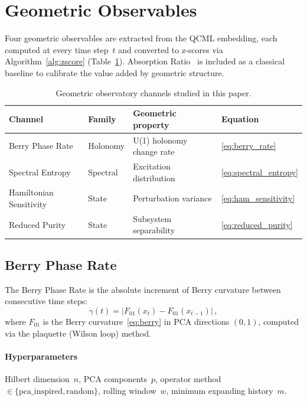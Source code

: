 \documentclass[3p]{elsarticle}
\begin{document}
\section{Geometric Observables}\label{sec:observables}

Four geometric observables are extracted from the QCML
embedding, each computed at every time step~$t$ and converted to
z-scores via Algorithm~\ref{alg:zscore}
(Table~\ref{tab:observatory_channels}).  Absorption
Ratio~\cite{kritzman2011} is included as a classical baseline
to calibrate the value added by geometric structure.

\begin{table}[htb]
\centering
\caption{Geometric observatory channels studied in this paper.}
\label{tab:observatory_channels}
\small
\begin{tabular}{llll}
\toprule
Channel & Family & Geometric property & Equation \\
\midrule
Berry Phase Rate & Holonomy & U(1) holonomy change rate & \eqref{eq:berry_rate} \\
Spectral Entropy & Spectral & Excitation distribution & \eqref{eq:spectral_entropy} \\
Hamiltonian Sensitivity & State & Perturbation variance & \eqref{eq:ham_sensitivity} \\
Reduced Purity & State & Subsystem separability & \eqref{eq:reduced_purity} \\
\bottomrule
\end{tabular}
\end{table}

\subsection{Berry Phase Rate}\label{subsec:berry}

The Berry Phase Rate is the absolute increment of Berry curvature
between consecutive time steps:
\begin{equation}\label{eq:berry_rate}
  \dot{\gamma}(t) = |F_{01}(x_t) - F_{01}(x_{t-1})|\,,
\end{equation}
where $F_{01}$ is the Berry curvature~\eqref{eq:berry} in PCA
directions $(0,1)$, computed via the plaquette (Wilson loop) method.

\paragraph{Hyperparameters}  Hilbert dimension~$n$, PCA
components~$p$, operator method $\in
\{\text{pca\_inspired},\allowbreak \text{random}\}$, rolling
window~$w$, minimum expanding history~$m$.
\end{document}
